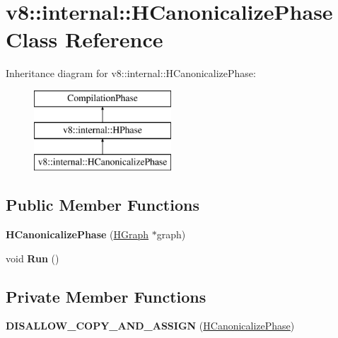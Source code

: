 \hypertarget{classv8_1_1internal_1_1_h_canonicalize_phase}{}\section{v8\+:\+:internal\+:\+:H\+Canonicalize\+Phase Class Reference}
\label{classv8_1_1internal_1_1_h_canonicalize_phase}
Inheritance diagram for v8\+:\+:internal\+:\+:H\+Canonicalize\+Phase\+:\begin{figure}[H]
\begin{center}
\leavevmode
\includegraphics[height=3.000000cm]{classv8_1_1internal_1_1_h_canonicalize_phase}
\end{center}
\end{figure}
\subsection*{Public Member Functions}
\begin{DoxyCompactItemize}
\item 
{\bfseries H\+Canonicalize\+Phase} (\hyperlink{classv8_1_1internal_1_1_h_graph}{H\+Graph} $\ast$graph)\hypertarget{classv8_1_1internal_1_1_h_canonicalize_phase_abdb64d64a05df04d5956d46668f59154}{}\label{classv8_1_1internal_1_1_h_canonicalize_phase_abdb64d64a05df04d5956d46668f59154}

\item 
void {\bfseries Run} ()\hypertarget{classv8_1_1internal_1_1_h_canonicalize_phase_a6feb1f0187b5fdd92f59375bca9ce920}{}\label{classv8_1_1internal_1_1_h_canonicalize_phase_a6feb1f0187b5fdd92f59375bca9ce920}

\end{DoxyCompactItemize}
\subsection*{Private Member Functions}
\begin{DoxyCompactItemize}
\item 
{\bfseries D\+I\+S\+A\+L\+L\+O\+W\+\_\+\+C\+O\+P\+Y\+\_\+\+A\+N\+D\+\_\+\+A\+S\+S\+I\+GN} (\hyperlink{classv8_1_1internal_1_1_h_canonicalize_phase}{H\+Canonicalize\+Phase})\hypertarget{classv8_1_1internal_1_1_h_canonicalize_phase_ae17de0a7cd7c19fdff8279ab5bf7e08b}{}\label{classv8_1_1internal_1_1_h_canonicalize_phase_ae17de0a7cd7c19fdff8279ab5bf7e08b}

\end{DoxyCompactItemize}
